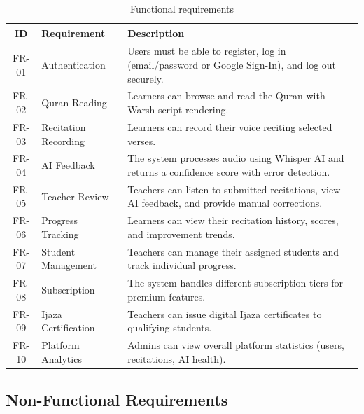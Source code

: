 \begin{table}[H]
  \centering
  \caption{Functional requirements}
  \label{tab:cs_func_req}
  \renewcommand{\arraystretch}{1.3}
  \begin{tabular}{clp{8cm}}
    \toprule
    \textbf{ID} & \textbf{Requirement} & \textbf{Description} \\
    \midrule
    FR-01 & Authentication & Users must be able to register, log in (email/password or Google Sign-In), and log out securely. \\
    FR-02 & Quran Reading & Learners can browse and read the Quran with Warsh script rendering. \\
    FR-03 & Recitation Recording & Learners can record their voice reciting selected verses. \\
    FR-04 & AI Feedback & The system processes audio using Whisper AI and returns a confidence score with error detection. \\
    FR-05 & Teacher Review & Teachers can listen to submitted recitations, view AI feedback, and provide manual corrections. \\
    FR-06 & Progress Tracking & Learners can view their recitation history, scores, and improvement trends. \\
    FR-07 & Student Management & Teachers can manage their assigned students and track individual progress. \\
    FR-08 & Subscription & The system handles different subscription tiers for premium features. \\
    FR-09 & Ijaza Certification & Teachers can issue digital Ijaza certificates to qualifying students. \\
    FR-10 & Platform Analytics & Admins can view overall platform statistics (users, recitations, AI health). \\
    \bottomrule
  \end{tabular}
\end{table}

\subsection{Non-Functional Requirements}

